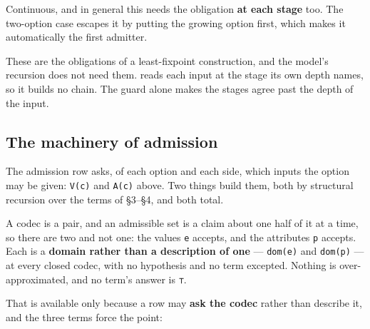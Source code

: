 \begin{theorem}
\label{thm:confluent-continuous}
\leanok
Continuous, and in general this needs the obligation \textbf{at each stage} too. The two-option case
escapes it by putting the growing option first, which makes it automatically the first admitter.
\end{theorem}

These are the obligations of a least-fixpoint construction, and the model's recursion does not need
them.  reads each input at the stage its own depth names, so it builds
no chain. The guard alone makes the stages agree past the depth of the input.

\subsection{The machinery of admission}\label{the-machinery-of-admission}

The admission row asks, of each option and each side, which inputs the option may be given:
\texttt{V(c)} and \texttt{A(c)} above. Two things build them, both by structural recursion over the terms of §3–§4, and
both total.

\begin{theorem}
\label{thm:admissible-exact}
\leanok
A codec is a pair, and an admissible set is a claim about one half of it at a time, so there are two
and not one: the values \texttt{e} accepts, and the attributes \texttt{p} accepts. Each is a \textbf{domain
rather than a description of one} — \texttt{dom(e)} and \texttt{dom(p)} — at every closed codec, with
no hypothesis and no term excepted. Nothing is over-approximated, and no term's answer is \texttt{⊤}.
\end{theorem}

That is available only because a row may \textbf{ask the codec} rather than describe it, and the three
terms force the point:

